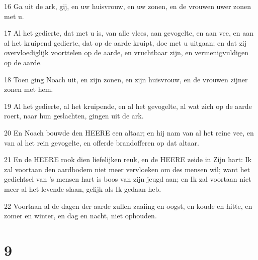 \par 16 Ga uit de ark, gij, en uw huisvrouw, en uw zonen, en de vrouwen uwer zonen met u.
\par 17 Al het gedierte, dat met u is, van alle vlees, aan gevogelte, en aan vee, en aan al het kruipend gedierte, dat op de aarde kruipt, doe met u uitgaan; en dat zij overvloediglijk voorttelen op de aarde, en vruchtbaar zijn, en vermenigvuldigen op de aarde.
\par 18 Toen ging Noach uit, en zijn zonen, en zijn huisvrouw, en de vrouwen zijner zonen met hem.
\par 19 Al het gedierte, al het kruipende, en al het gevogelte, al wat zich op de aarde roert, naar hun geslachten, gingen uit de ark.
\par 20 En Noach bouwde den HEERE een altaar; en hij nam van al het reine vee, en van al het rein gevogelte, en offerde brandofferen op dat altaar.
\par 21 En de HEERE rook dien liefelijken reuk, en de HEERE zeide in Zijn hart: Ik zal voortaan den aardbodem niet meer vervloeken om des mensen wil; want het gedichtsel van 's mensen hart is boos van zijn jeugd aan; en Ik zal voortaan niet meer al het levende slaan, gelijk als Ik gedaan heb.
\par 22 Voortaan al de dagen der aarde zullen zaaiing en oogst, en koude en hitte, en zomer en winter, en dag en nacht, niet ophouden.

\chapter{9}

